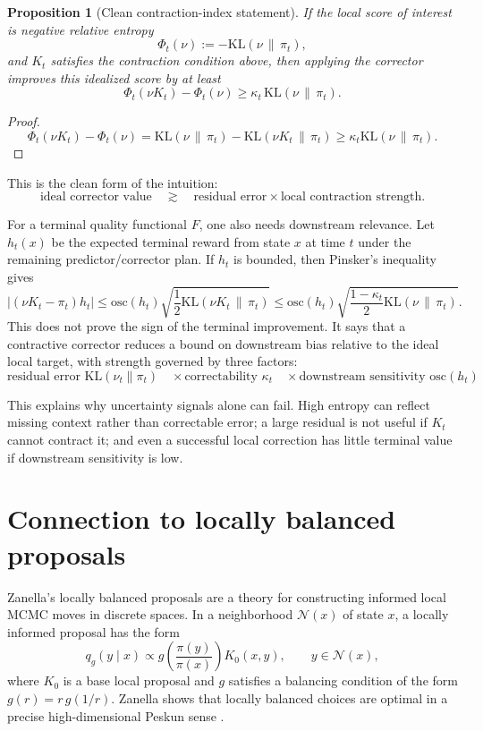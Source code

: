 \documentclass[11pt]{article}
\newtheorem{proposition}{Proposition}
\newcommand{\1}{\mathbf 1}
\newcommand{\KL}{\mathrm{KL}}
\newcommand{\osc}{\mathrm{osc}}
\begin{document}
\begin{proposition}[Clean contraction-index statement]
If the local score of interest is negative relative entropy
\[
  \Phi_t(\nu):=-\KL(\nu\,\|\,\pi_t),
\]
and \(K_t\) satisfies the contraction condition above, then applying the
corrector improves this idealized score by at least
\[
  \Phi_t(\nu K_t)-\Phi_t(\nu)
  \ge
  \kappa_t\,\KL(\nu\,\|\,\pi_t).
\]
\end{proposition}

\begin{proof}
\[
\Phi_t(\nu K_t)-\Phi_t(\nu)
=
\KL(\nu\,\|\,\pi_t)-\KL(\nu K_t\,\|\,\pi_t)
\ge
\kappa_t \KL(\nu\,\|\,\pi_t).
\]
\end{proof}

This is the clean form of the intuition:
\[
  \text{ideal corrector value}
  \quad \gtrsim \quad
  \text{residual error}\times\text{local contraction strength}.
\]

For a terminal quality functional \(F\), one also needs downstream relevance.
Let \(h_t(x)\) be the expected terminal reward from state \(x\) at time \(t\)
under the remaining predictor/corrector plan.  If \(h_t\) is bounded, then
Pinsker's inequality gives
\[
  |(\nu K_t-\pi_t)h_t|
  \le
  \osc(h_t)\sqrt{\frac{1}{2}\KL(\nu K_t\,\|\,\pi_t)}
  \le
  \osc(h_t)\sqrt{\frac{1-\kappa_t}{2}\KL(\nu\,\|\,\pi_t)}.
\]
This does not prove the sign of the terminal improvement.  It says that a
contractive corrector reduces a bound on downstream bias relative to the ideal
local target, with strength governed by three factors:
\[
  \boxed{
  \text{residual error } \KL(\nu_t\|\pi_t)
  \quad
  \times
  \text{correctability } \kappa_t
  \quad
  \times
  \text{downstream sensitivity } \osc(h_t)
  }.
\]

This explains why uncertainty signals alone can fail.  High entropy can reflect
missing context rather than correctable error; a large residual is not useful
if \(K_t\) cannot contract it; and even a successful local correction has little
terminal value if downstream sensitivity is low.

\section{Connection to locally balanced proposals}

Zanella's locally balanced proposals are a theory for constructing informed
local MCMC moves in discrete spaces.  In a neighborhood \(\mathcal N(x)\) of
state \(x\), a locally informed proposal has the form
\[
  q_g(y\mid x)
  \propto
  g\!\left(\frac{\pi(y)}{\pi(x)}\right)K_0(x,y),
  \qquad y\in\mathcal N(x),
\]
where \(K_0\) is a base local proposal and \(g\) satisfies a balancing
condition of the form \(g(r)=r\,g(1/r)\).  Zanella shows that locally balanced
choices are optimal in a precise high-dimensional Peskun sense
\cite{zanella2020informed}.
\end{document}
